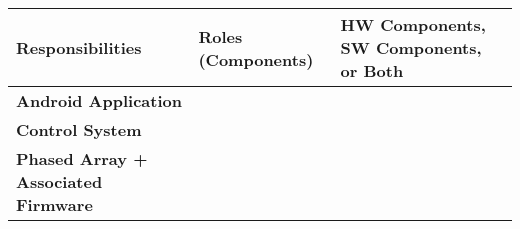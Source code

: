 \documentclass[RRC.tex]{subfiles}
\begin{document}
\bigskip

\begin{center}
	\begin{tabular}{ | p{5cm} | p{5cm} | p{5cm} |}
		\hline
		Responsibilities & Roles (Components) & HW Components, SW Components, or Both \\ \hline
		\textbf{Android Application} & & \\ \hline
		\textbf{Control System} & & \\ \hline
		\textbf{Phased Array + Associated Firmware} & & \\ \hline
		
	\end{tabular}
\end{center}
\end{document}
